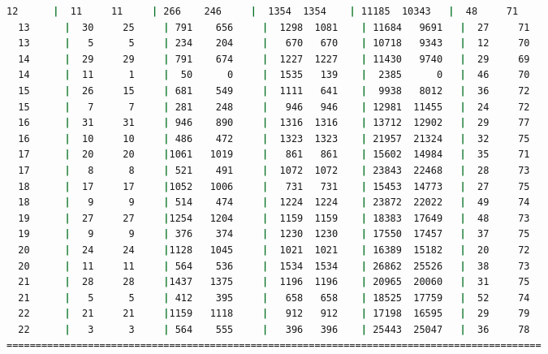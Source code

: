 \begin{adjustbox}{max width=\textwidth}
\begin{lstlisting}[language=bash,basicstyle=\ttfamily\scriptsize]
  12      |  11     11     | 266    246     |  1354  1354    | 11185  10343   |  48     71
  13      |  30     25     | 791    656     |  1298  1081    | 11684   9691   |  27     71
  13      |   5      5     | 234    204     |   670   670    | 10718   9343   |  12     70
  14      |  29     29     | 791    674     |  1227  1227    | 11430   9740   |  29     69
  14      |  11      1     |  50      0     |  1535   139    |  2385      0   |  46     70
  15      |  26     15     | 681    549     |  1111   641    |  9938   8012   |  36     72
  15      |   7      7     | 281    248     |   946   946    | 12981  11455   |  24     72
  16      |  31     31     | 946    890     |  1316  1316    | 13712  12902   |  29     77
  16      |  10     10     | 486    472     |  1323  1323    | 21957  21324   |  32     75
  17      |  20     20     |1061   1019     |   861   861    | 15602  14984   |  35     71
  17      |   8      8     | 521    491     |  1072  1072    | 23843  22468   |  28     73
  18      |  17     17     |1052   1006     |   731   731    | 15453  14773   |  27     75
  18      |   9      9     | 514    474     |  1224  1224    | 23872  22022   |  49     74
  19      |  27     27     |1254   1204     |  1159  1159    | 18383  17649   |  48     73
  19      |   9      9     | 376    374     |  1230  1230    | 17550  17457   |  37     75
  20      |  24     24     |1128   1045     |  1021  1021    | 16389  15182   |  20     72
  20      |  11     11     | 564    536     |  1534  1534    | 26862  25526   |  38     73
  21      |  28     28     |1437   1375     |  1196  1196    | 20965  20060   |  31     75
  21      |   5      5     | 412    395     |   658   658    | 18525  17759   |  52     74
  22      |  21     21     |1159   1118     |   912   912    | 17198  16595   |  29     79
  22      |   3      3     | 564    555     |   396   396    | 25443  25047   |  36     78
============================================================================================
\end{lstlisting}
\end{adjustbox}

